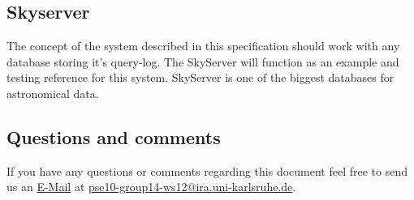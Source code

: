 \subsection*{Skyserver}
The concept of the system described in this specification should work with any \gls{database}
storing it's query-log. The \gls{SkyServer} will function
as an example and testing reference for this system. 
\gls{SkyServer} is one of the biggest \glspl{database} for astronomical data.
 

\subsection*{Questions and comments}
If you have any questions or comments regarding this document feel free to send us an 
 \href{mailto:pse10-group14-ws12@ira.uni-karlsruhe.de}{E-Mail} at 
 \href{mailto:pse10-group14-ws12@ira.uni-karlsruhe.de}{pse10-group14-ws12@ira.uni-karlsruhe.de}.







